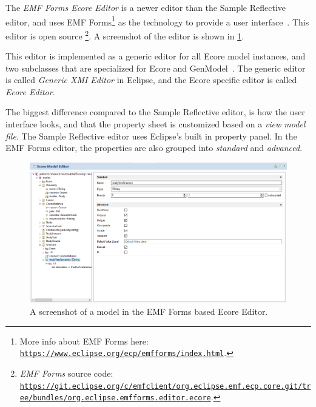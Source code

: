 The \textit{EMF Forms Ecore Editor} is a newer editor than the Sample Reflective editor, and uses EMF Forms\footnote{More info about EMF Forms here: \href{https://www.eclipse.org/ecp/emfforms/index.html}{\nolinkurl{https://www.eclipse.org/ecp/emfforms/index.html}}.} as the technology to provide a user interface~\cite{eclipsesourceEMFFormsEditors2016}.
This editor is \gls{open source}%
\footnote{\textit{EMF Forms} source code: \href{https://git.eclipse.org/c/emfclient/org.eclipse.emf.ecp.core.git/tree/bundles/org.eclipse.emfforms.editor.ecore}{\nolinkurl{https://git.eclipse.org/c/emfclient/org.eclipse.emf.ecp.core.git/tree/bundles/org.eclipse.emfforms.editor.ecore}}.}.
A screenshot of the editor is shown in \cref{fig:emf-forms-ecore-editor}.


This editor is implemented as a generic editor for all \gls{Ecore} model instances, and two subclasses that are specialized for \gls{Ecore} and GenModel~\cite{eclipsesourceEMFFormsEditors2016}.
The generic editor is called \textit{Generic XMI Editor} in \gls{Eclipse}, and the \gls{Ecore} specific editor is called \textit{Ecore Editor}.


The biggest difference compared to the Sample Reflective editor, is how the user interface looks, and that the property sheet is customized based on a \textit{view model file}.
The Sample Reflective editor uses \gls{Eclipse}'s built in property panel.
In the EMF Forms editor, the properties are also grouped into \textit{standard} and \textit{advanced}.

\begin{figure}[htbp]  %
  \centering
  \includegraphics[width=\textwidth]{figures/pre-project/ecore-eclipse-emf-forms-model-editor.png}
  \caption[EMF Forms Ecore Editor]{A screenshot of a model in the EMF Forms based Ecore Editor.}\label{fig:emf-forms-ecore-editor}
\end{figure}


